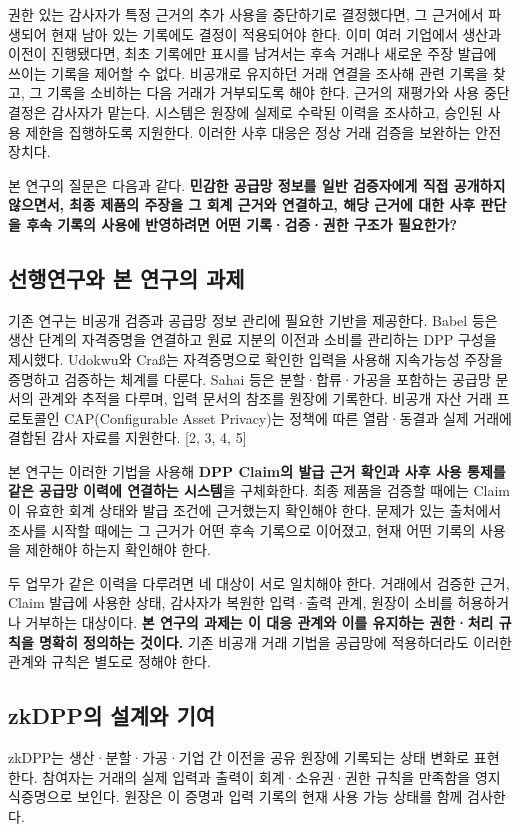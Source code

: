 권한 있는 감사자가 특정 근거의 추가 사용을 중단하기로 결정했다면, 그 근거에서 파생되어 현재 남아 있는 기록에도 결정이 적용되어야 한다.
이미 여러 기업에서 생산과 이전이 진행됐다면, 최초 기록에만 표시를 남겨서는 후속 거래나 새로운 주장 발급에 쓰이는 기록을 제어할 수 없다.
비공개로 유지하던 거래 연결을 조사해 관련 기록을 찾고, 그 기록을 소비하는 다음 거래가 거부되도록 해야 한다.
근거의 재평가와 사용 중단 결정은 감사자가 맡는다.
시스템은 원장에 실제로 수락된 이력을 조사하고, 승인된 사용 제한을 집행하도록 지원한다.
이러한 사후 대응은 정상 거래 검증을 보완하는 안전장치다.

본 연구의 질문은 다음과 같다.
\textbf{민감한 공급망 정보를 일반 검증자에게 직접 공개하지 않으면서, 최종 제품의 주장을 그 회계 근거와 연결하고, 해당 근거에 대한 사후 판단을 후속 기록의 사용에 반영하려면 어떤 기록·검증·권한 구조가 필요한가?}

\subsection{선행연구와 본 연구의 과제}
기존 연구는 비공개 검증과 공급망 정보 관리에 필요한 기반을 제공한다.
Babel 등은 생산 단계의 자격증명을 연결하고 원료 지분의 이전과 소비를 관리하는 DPP 구성을 제시했다.
Udokwu와 Craß는 자격증명으로 확인한 입력을 사용해 지속가능성 주장을 증명하고 검증하는 체계를 다룬다.
Sahai 등은 분할·합류·가공을 포함하는 공급망 문서의 관계와 추적을 다루며, 입력 문서의 참조를 원장에 기록한다.
비공개 자산 거래 프로토콜인 CAP(Configurable Asset Privacy)는 정책에 따른 열람·동결과 실제 거래에 결합된 감사 자료를 지원한다. [2, 3, 4, 5]

본 연구는 이러한 기법을 사용해 \textbf{DPP Claim의 발급 근거 확인과 사후 사용 통제를 같은 공급망 이력에 연결하는 시스템}을 구체화한다.
최종 제품을 검증할 때에는 Claim이 유효한 회계 상태와 발급 조건에 근거했는지 확인해야 한다.
문제가 있는 출처에서 조사를 시작할 때에는 그 근거가 어떤 후속 기록으로 이어졌고, 현재 어떤 기록의 사용을 제한해야 하는지 확인해야 한다.

두 업무가 같은 이력을 다루려면 네 대상이 서로 일치해야 한다.
거래에서 검증한 근거, Claim 발급에 사용한 상태, 감사자가 복원한 입력·출력 관계, 원장이 소비를 허용하거나 거부하는 대상이다.
\textbf{본 연구의 과제는 이 대응 관계와 이를 유지하는 권한·처리 규칙을 명확히 정의하는 것이다.}
기존 비공개 거래 기법을 공급망에 적용하더라도 이러한 관계와 규칙은 별도로 정해야 한다.

\subsection{zkDPP의 설계와 기여}
zkDPP는 생산·분할·가공·기업 간 이전을 공유 원장에 기록되는 상태 변화로 표현한다.
참여자는 거래의 실제 입력과 출력이 회계·소유권·권한 규칙을 만족함을 영지식증명으로 보인다.
원장은 이 증명과 입력 기록의 현재 사용 가능 상태를 함께 검사한다.

